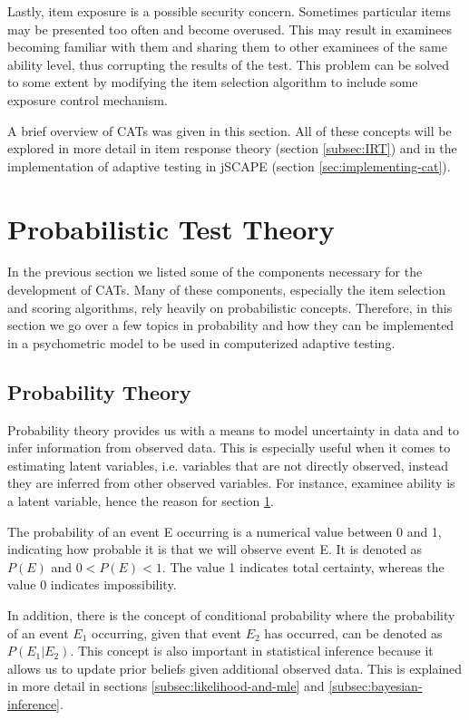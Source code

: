 Lastly, item exposure is a possible security concern. Sometimes particular items may be presented too often and become overused. This may result in examinees becoming familiar with them and sharing them to other examinees of the same ability level, thus corrupting the results of the test. This problem can be solved to some extent by modifying the item selection algorithm to include some exposure control mechanism.\newline

A brief overview of CATs was given in this section. All of these concepts will be explored in more detail in item response theory (section \ref{subsec:IRT}) and in the implementation of adaptive testing in jSCAPE (section \ref{sec:implementing-cat}).

\section{Probabilistic Test Theory}
\label{sec:probabilistic-test-theory}
In the previous section we listed some of the components necessary for the development of CATs. Many of these components, especially the item selection and scoring algorithms, rely heavily on probabilistic concepts. Therefore, in this section we go over a few topics in probability and how they can be implemented in a psychometric model to be used in computerized adaptive testing.

\subsection{Probability Theory}
\label{subsec:probability-theory}
Probability theory provides us with a means to model uncertainty in data and to infer information from observed data. This is especially useful when it comes to estimating latent variables, i.e. variables that are not directly observed, instead they are inferred from other observed variables. For instance, examinee ability is a latent variable, hence the reason for section \ref{sec:probabilistic-test-theory}.
\newline

The probability of an event E occurring is a numerical value between 0 and 1, indicating how probable it is that we will observe event E. It is denoted as $P(E)$ and $0 < P(E) < 1$. The value 1 indicates total certainty, whereas the value 0 indicates impossibility. \newline

In addition, there is the concept of conditional probability where the probability of an event $E_1$ occurring, given that event $E_2$ has occurred, can be denoted as $P(E_1|E_2)$. This concept is also important in statistical inference because it allows us to update prior beliefs given additional observed data. This is explained in more detail in sections \ref{subsec:likelihood-and-mle} and \ref{subsec:bayesian-inference}.

